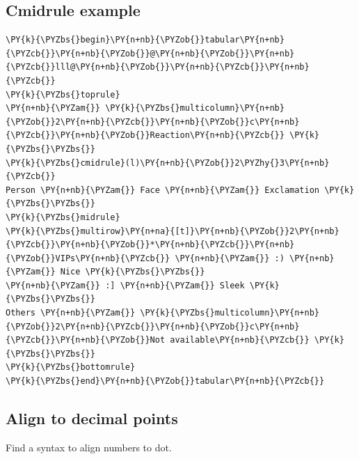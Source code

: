 \documentclass[a4paper,twoside]{article}
\begin{document}
\subsection{Cmidrule example}
\begin{tscode}[lang=latex, engine=pygments]
\begin{Verbatim}[commandchars=\\\{\},breaklines, breakanywhere, commandchars=\\\{\}]
\PY{k}{\PYZbs{}begin}\PY{n+nb}{\PYZob{}}tabular\PY{n+nb}{\PYZcb{}}\PY{n+nb}{\PYZob{}}@\PY{n+nb}{\PYZob{}}\PY{n+nb}{\PYZcb{}}lll@\PY{n+nb}{\PYZob{}}\PY{n+nb}{\PYZcb{}}\PY{n+nb}{\PYZcb{}}
\PY{k}{\PYZbs{}toprule}
\PY{n+nb}{\PYZam{}} \PY{k}{\PYZbs{}multicolumn}\PY{n+nb}{\PYZob{}}2\PY{n+nb}{\PYZcb{}}\PY{n+nb}{\PYZob{}}c\PY{n+nb}{\PYZcb{}}\PY{n+nb}{\PYZob{}}Reaction\PY{n+nb}{\PYZcb{}} \PY{k}{\PYZbs{}\PYZbs{}}
\PY{k}{\PYZbs{}cmidrule}(l)\PY{n+nb}{\PYZob{}}2\PYZhy{}3\PY{n+nb}{\PYZcb{}}
Person \PY{n+nb}{\PYZam{}} Face \PY{n+nb}{\PYZam{}} Exclamation \PY{k}{\PYZbs{}\PYZbs{}}
\PY{k}{\PYZbs{}midrule}
\PY{k}{\PYZbs{}multirow}\PY{n+na}{[t]}\PY{n+nb}{\PYZob{}}2\PY{n+nb}{\PYZcb{}}\PY{n+nb}{\PYZob{}}*\PY{n+nb}{\PYZcb{}}\PY{n+nb}{\PYZob{}}VIPs\PY{n+nb}{\PYZcb{}} \PY{n+nb}{\PYZam{}} :) \PY{n+nb}{\PYZam{}} Nice \PY{k}{\PYZbs{}\PYZbs{}}
\PY{n+nb}{\PYZam{}} :] \PY{n+nb}{\PYZam{}} Sleek \PY{k}{\PYZbs{}\PYZbs{}}
Others \PY{n+nb}{\PYZam{}} \PY{k}{\PYZbs{}multicolumn}\PY{n+nb}{\PYZob{}}2\PY{n+nb}{\PYZcb{}}\PY{n+nb}{\PYZob{}}c\PY{n+nb}{\PYZcb{}}\PY{n+nb}{\PYZob{}}Not available\PY{n+nb}{\PYZcb{}} \PY{k}{\PYZbs{}\PYZbs{}}
\PY{k}{\PYZbs{}bottomrule}
\PY{k}{\PYZbs{}end}\PY{n+nb}{\PYZob{}}tabular\PY{n+nb}{\PYZcb{}}
\end{Verbatim}
\end{tscode}
\subsection{Align to decimal points}
Find a syntax to align numbers to dot. 
\end{document}
